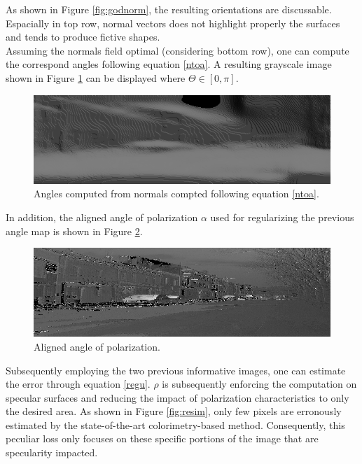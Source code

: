 As shown in Figure \ref{fig:godnorm}, the resulting orientations are discussable. Espacially in top row, normal vectors does not highlight properly the surfaces and tends to produce fictive shapes. \\
Assuming the normals field optimal (considering bottom row), one can compute the correspond angles following equation \ref{ntoa}. A resulting grayscale image shown in Figure \ref{fig:tan} can be displayed where $\Theta\in\left[0,\pi\right]$.

\begin{figure}[h]
	\centering
	\includegraphics[width=0.8\linewidth]{Figures/Fusion/tan}
	\caption[Angles computed from normals.]{Angles computed from normals compted following equation \ref{ntoa}.}
	\label{fig:tan}
\end{figure}

In addition, the aligned angle of polarization $\alpha$ used for regularizing the previous angle map is shown in Figure \ref{fig:angleofp}.

\begin{figure}[h]
	\centering
	\includegraphics[width=0.8\linewidth]{Figures/Fusion/angleofp}
	\caption{Aligned angle of polarization.}
	\label{fig:angleofp}
\end{figure}

Subsequently employing the two previous informative images, one can estimate the error through equation \ref{regu}. $\rho$ is subsequently enforcing the computation on specular surfaces and reducing the impact of polarization characteristics to only the desired area. As shown in Figure \ref{fig:resim}, only few pixels are erronously estimated by the state-of-the-art colorimetry-based method. Consequently, this peculiar loss only focuses on these specific portions of the image that are specularity impacted.

